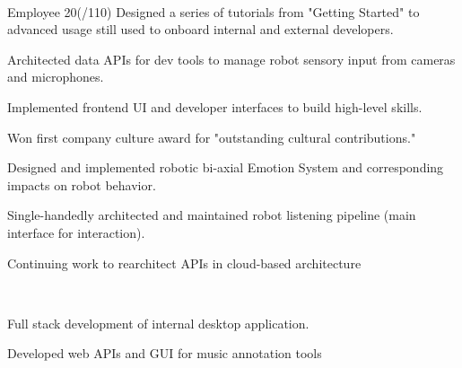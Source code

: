 \documentclass[]{csaund_resume-openfont}
\begin{document}
\begin{minipage}[t]{0.66\textwidth}
 \\
\begin{tightemize}
\item Employee 20(/110) Designed a series of tutorials from "Getting Started" to advanced usage still used to onboard internal and external developers.
\item Architected data APIs for dev tools to manage robot sensory input from cameras and microphones.
\item Implemented frontend UI and developer interfaces to build high-level skills.
\item Won first company culture award for "outstanding cultural contributions."
\end{tightemize}
\begin{tightemize}
\item Designed and implemented robotic bi-axial Emotion System and corresponding impacts on robot behavior.
\item Single-handedly architected and maintained robot listening pipeline (main interface for interaction).
\end{tightemize}
\begin{tightemize}
\item Continuing work to rearchitect APIs in cloud-based architecture
\end{tightemize}
\sectionsep

 \\
\begin{tightemize}
\item Full stack development of internal desktop application.
\item Developed web APIs and GUI for music annotation tools
\end{tightemize}
\sectionsep




\end{minipage}
\end{document}
